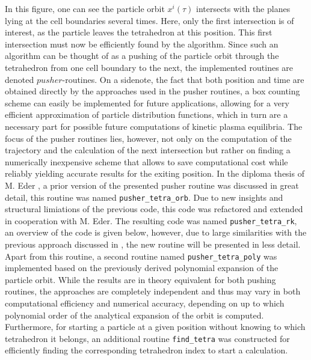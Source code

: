 \documentclass[./main.tex]{subfiles}
\begin{document}
In this figure, one can see the particle orbit $x^i(\tau)$ intersects with the planes lying at the cell boundaries several times. Here, only the first intersection is of interest, as the particle leaves the tetrahedron at this position. This first intersection must now be efficiently found by the algorithm. Since such an algorithm can be thought of as a pushing of the particle orbit through the tetrahedron from one cell boundary to the next, the implemented routines are denoted $pusher$-routines. On a sidenote, the fact that both position and time are obtained directly by the approaches used in the pusher routines, a box counting scheme can easily be implemented for future applications, allowing for a very efficient approximation of particle distribution functions, which in turn are a necessary part for possible future computations of kinetic plasma equilibria. The focus of the pusher routines lies, however, not only on the computation of the trajectory and the calculation of the next intersection but rather on finding a numerically inexpensive scheme that allows to save computational cost while reliably yielding accurate results for the exiting position. In the diploma thesis of M. Eder \cite{Eder_DA}, a prior version of the presented pusher routine was discussed in great detail, this routine was named \texttt{pusher\_tetra\_orb}. Due to new insights and structural limiations of the previous code, this code was refactored and extended in cooperation with M. Eder. The resulting code was named \texttt{pusher\_tetra\_rk}, an overview of the code is given below, however, due to large similarities with the previous approach discussed in \cite{Eder_DA}, the new routine will be presented in less detail. Apart from this routine, a second routine named \texttt{pusher\_tetra\_poly} was implemented based on the previously derived polynomial expansion of the particle orbit. While the results are in theory equivalent for both pushing routines, the approaches are completely independent and thus may vary in both computational efficiency and numerical accuracy, depending on up to which polynomial order of  the analytical expansion of the orbit is computed. Furthermore, for starting a particle at a given position without knowing to which tetrahedron it belongs, an additional routine \texttt{find\_tetra} was constructed for efficiently finding the corresponding tetrahedron index to start a calculation.
\end{document}
